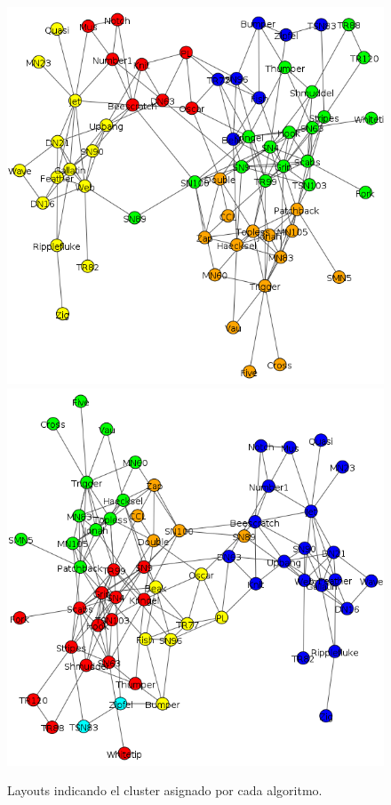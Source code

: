 \begin{figure}
\includegraphics[scale = 0.2]{graph_Louvain}
\includegraphics[scale = 0.2]{graph_Infomap}
\caption{Layouts indicando el cluster asignado por cada algoritmo.}
\label{fig:Layouts_clusters}
\end{figure}

